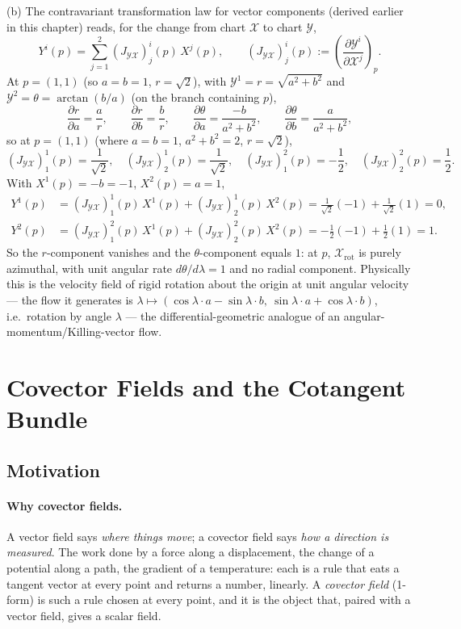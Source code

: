 \documentclass[11pt]{article}
\begin{document}
(b) The contravariant transformation law for vector components (derived
earlier in this chapter) reads, for the change from chart $\mathcal X$ to
chart $\mathcal Y$,
\[
Y^i(p) = \sum_{j=1}^2 (J_{\mathcal{YX}})^i_j(p)\,X^j(p),\qquad (J_{\mathcal{YX}})^i_j(p):=\left(\frac{\partial\mathcal Y^i}{\partial\mathcal X^j}\right)_p.
\]
At $p=(1,1)$ (so $a=b=1$, $r=\sqrt2$), with $\mathcal Y^1=r=\sqrt{a^2+b^2}$
and $\mathcal Y^2=\theta=\arctan(b/a)$ (on the branch containing $p$),
\[
\frac{\partial r}{\partial a} = \frac ar,\qquad \frac{\partial r}{\partial b}=\frac br,\qquad \frac{\partial\theta}{\partial a} = \frac{-b}{a^2+b^2},\qquad \frac{\partial\theta}{\partial b}=\frac{a}{a^2+b^2},
\]
so at $p=(1,1)$ (where $a=b=1$, $a^2+b^2=2$, $r=\sqrt2$),
\[
(J_{\mathcal{YX}})^1_1(p)=\frac{1}{\sqrt2},\quad (J_{\mathcal{YX}})^1_2(p)=\frac{1}{\sqrt2},\quad (J_{\mathcal{YX}})^2_1(p)=-\frac12,\quad (J_{\mathcal{YX}})^2_2(p)=\frac12.
\]
With $X^1(p)=-b=-1$, $X^2(p)=a=1$,
\begin{align*}
Y^1(p) &= (J_{\mathcal{YX}})^1_1(p)\,X^1(p)+(J_{\mathcal{YX}})^1_2(p)\,X^2(p) = \frac{1}{\sqrt2}(-1)+\frac{1}{\sqrt2}(1) = 0, \\
Y^2(p) &= (J_{\mathcal{YX}})^2_1(p)\,X^1(p)+(J_{\mathcal{YX}})^2_2(p)\,X^2(p) = -\frac12(-1)+\frac12(1) = 1.
\end{align*}
So the $r$-component vanishes and the $\theta$-component equals $1$: at
$p$, $\mathcal X_{\mathrm{rot}}$ is purely azimuthal, with unit angular
rate $d\theta/d\lambda=1$ and no radial component. Physically this is the
velocity field of rigid rotation about the origin at unit angular
velocity — the flow it generates is $\lambda\mapsto(\cos\lambda\cdot
a-\sin\lambda\cdot b,\ \sin\lambda\cdot a+\cos\lambda\cdot b)$, i.e.\
rotation by angle $\lambda$ — the differential-geometric analogue of an
angular-momentum/Killing-vector flow.

\section{Covector Fields and the Cotangent Bundle}

\subsection*{Motivation}

\paragraph{Why covector fields.}
A vector field says \emph{where things move}; a covector field says \emph{how a direction is measured}. The work done by a force along a displacement, the change of a potential along a path, the gradient of a temperature: each is a rule that eats a tangent vector at every point and returns a number, linearly. A \emph{covector field} (1-form) is such a rule chosen at every point, and it is the object that, paired with a vector field, gives a scalar field.
\end{document}
